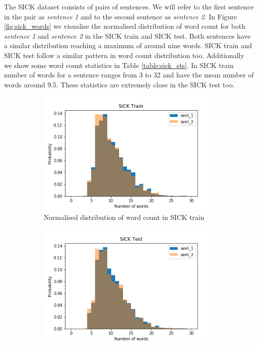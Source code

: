 \begin{enumerate}
The SICK dataset consists of pairs of sentences. We will refer to the first sentence in the pair as \emph{sentence 1} and to the second sentence as \emph{sentence 2}. In Figure \ref{fig:sick_words} we visualise the normalised distribution of word count for both \emph{sentence 1} and \emph{sentence 2} in the SICK train and SICK test. Both sentences have a similar distribution reaching a maximum of around nine words. SICK train and SICK test follow a similar pattern in word count distribution too. Additionally we show some word count statistics in Table \ref{table:sick_sts}. In SICK train number of words for a sentence ranges from 3 to 32 and have the mean number of words around 9.5. These statistics are extremely close in the SICK test too. 


\begin{figure}
	\captionsetup[subfigure]{justification=centering}
	\centering
	\begin{subfigure}[b]{.5\textwidth}
		\centering
		\includegraphics[width=\textwidth]{figures/semantic_textual_similarity/introduction/sick_train_words.png}
		\caption{Normalised distribution of word count in SICK train}
		\label{fig:sick_train_words}
	\end{subfigure}%
	\begin{subfigure}[b]{.5\textwidth}
		\centering
		\includegraphics[width=\textwidth]{figures/semantic_textual_similarity/introduction/sick_test_words.png}

\end{subfigure}
\end{figure}
\end{enumerate}

